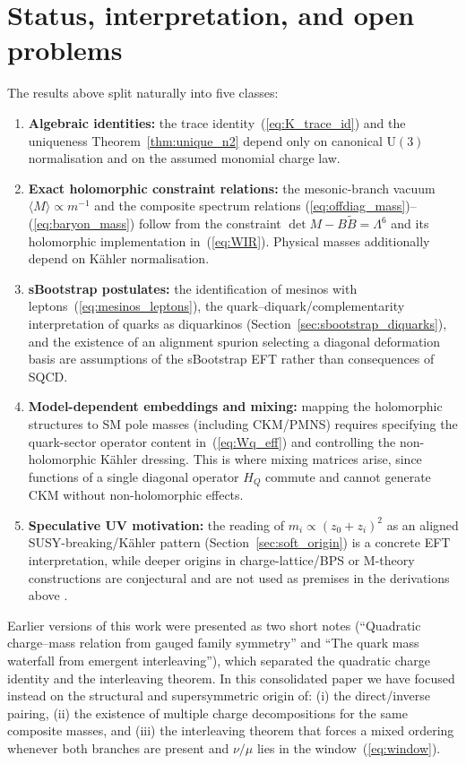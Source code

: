 \documentclass[11pt,a4paper]{article}
\newcommand{\UU}{\mathrm{U}}
\begin{document}
\section{Status, interpretation, and open problems}
\label{sec:status}

The results above split naturally into five classes:
\begin{enumerate}
  \item \textbf{Algebraic identities:} the trace identity~(\ref{eq:K_trace_id})
    and the uniqueness Theorem~\ref{thm:unique_n2} depend only on canonical
    $\UU(3)$ normalisation and on the assumed monomial charge law.
  \item \textbf{Exact holomorphic constraint relations:}
    the mesonic-branch vacuum $\langle M\rangle\propto m^{-1}$ and the composite
    spectrum relations (\ref{eq:offdiag_mass})--(\ref{eq:baryon_mass}) follow
    from the constraint $\det M-B\tilde B=\Lambda^6$ and its holomorphic
    implementation in~(\ref{eq:WIR}).  Physical masses additionally depend on
    K\"ahler normalisation.
  \item \textbf{sBootstrap postulates:} the identification of mesinos with
    leptons~(\ref{eq:mesinos_leptons}), the quark--diquark/complementarity
    interpretation of quarks as diquarkinos (Section~\ref{sec:sbootstrap_diquarks}),
    and the existence of an alignment spurion selecting a diagonal deformation
    basis are assumptions of the sBootstrap EFT rather than consequences of SQCD.
  \item \textbf{Model-dependent embeddings and mixing:} mapping the holomorphic
    structures to SM pole masses (including CKM/PMNS) requires specifying the
    quark-sector operator content in~(\ref{eq:Wq_eff}) and controlling the
    non-holomorphic K\"ahler dressing.  This is where mixing matrices arise,
    since functions of a single diagonal operator $H_Q$ commute and cannot
    generate CKM without non-holomorphic effects.
  \item \textbf{Speculative UV motivation:} the reading of
    $m_i\propto(z_0+z_i)^2$ as an aligned SUSY-breaking/K\"ahler pattern
    (Section~\ref{sec:soft_origin}) is a concrete EFT interpretation, while
    deeper origins in charge-lattice/BPS or M-theory constructions are
    conjectural and are not used as premises in the derivations above
    \cite{Narain:1986,Ferrara:1995ih}.
\end{enumerate}

Earlier versions of this work were presented as two short notes
(``Quadratic charge--mass relation from gauged family symmetry'' and
``The quark mass waterfall from emergent interleaving''),
which separated the quadratic charge identity and the interleaving theorem.
In this consolidated paper we have focused instead on the structural and
supersymmetric origin of: (i) the direct/inverse pairing, (ii) the existence of
multiple charge decompositions for the same composite masses, and (iii) the
interleaving theorem that forces a mixed ordering whenever both branches are
present and $\nu/\mu$ lies in the window~(\ref{eq:window}).
\end{document}
